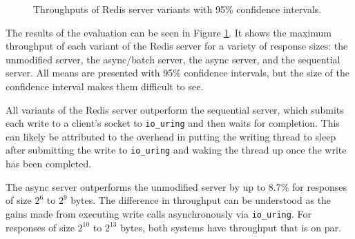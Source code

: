 \documentclass[sigconf]{acmart}
\newcommand{\inlinecode}[1]{\texttt{#1}}
\begin{document}
\begin{figure}[h!]
\caption{Throughputs of Redis server variants with 95\% confidence intervals.}
\label{fig:main}
\end{figure}


The results of the evaluation can be seen in Figure \ref{fig:main}.
It shows the maximum throughput of each variant of the Redis server for a variety of response sizes: the unmodified server, the async/batch server, the async server, and the sequential server.
All means are presented with 95\% confidence intervals, but the size of the confidence interval makes them difficult to see.

All variants of the Redis server outperform the sequential server, which submits each write to a client's socket to \inlinecode{io\_uring} and then waits for completion.
This can likely be attributed to the overhead in putting the writing thread to sleep after submitting the write to \inlinecode{io\_uring} and waking the thread up once the write has been completed.

The async server outperforms the unmodified server by up to 8.7\% for responses of size $2^{6}$ to $2^{9}$ bytes.
The difference in throughput can be understood as the gains made from executing write calls asynchronously via \inlinecode{io\_uring}.
For responses of size $2^{10}$ to $2^{13}$ bytes, both systems have throughput that is on par.
\end{document}
